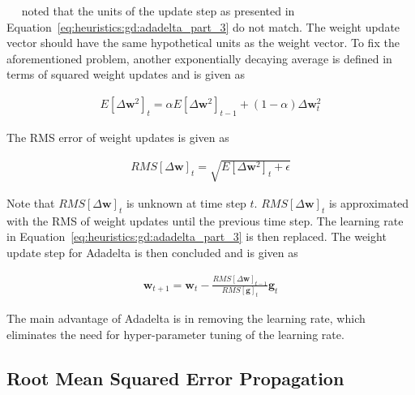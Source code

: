 ~\citeauthor{ref:zeiler:2012}~\cite{ref:zeiler:2012} noted that the units of the update step as presented in Equation~\eqref{eq:heuristics:gd:adadelta_part_3} do not match. The weight update vector should have the same hypothetical units as the weight vector. To fix the aforementioned problem, another exponentially decaying average is defined in terms of squared weight updates and is given as

\begin{equation}
	\label{eq:heuristics:gd:adadelta_part_4}
	\begin{split}
		E[\Delta \boldsymbol{w}^{2}]_{t} = \alpha E[\Delta \boldsymbol{w}^{2}]_{t - 1} + (1 - \alpha)\Delta \boldsymbol{w}_{t}^{2}
	\end{split}
\end{equation}

The \acf{RMS} error of weight updates is given as

\begin{equation}
	\label{eq:heuristics:gd:adadelta_part_5}
	\begin{split}
		RMS[\Delta \boldsymbol{w}]_{t} = \sqrt{E[\Delta \boldsymbol{w}^{2}]_{t} + \epsilon}
	\end{split}
\end{equation}

Note that $RMS[\Delta \boldsymbol{w}]_{t}$ is unknown at time step $t$. $RMS[\Delta \boldsymbol{w}]_{t}$ is approximated with the \acf{RMS} of weight updates until the previous time step. The learning rate in Equation~\eqref{eq:heuristics:gd:adadelta_part_3} is then replaced. The weight update step for \acs{Adadelta} is then concluded and is given as

\begin{equation}
	\label{eq:heuristics:gd:adadelta_part_6}
	\begin{split}
		\boldsymbol{w}_{t+1} = \boldsymbol{w}_{t} - \frac{RMS[\Delta \boldsymbol{w}]_{t-1}}{RMS[\boldsymbol{g}]_{t}} \boldsymbol{g}_{t}
	\end{split}
\end{equation}

The main advantage of \acs{Adadelta} is in removing the learning rate, which eliminates the need for hyper-parameter tuning of the learning rate.

\subsection{Root Mean Squared Error Propagation}\label{sec:heuristics:rmsprop}

